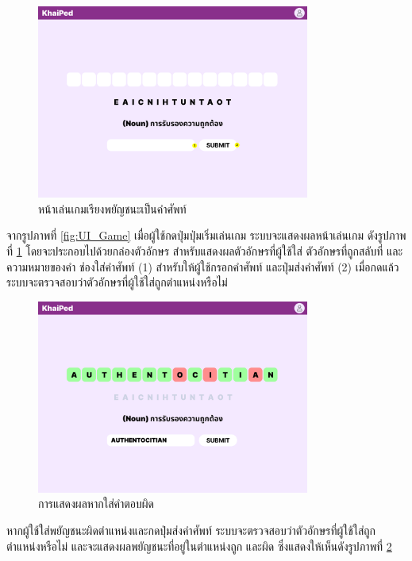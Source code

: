 \documentclass[12pt,oneside,openright,a4paper]{cpe-thai-project}
\begin{document}
\pagebreak
\begin{figure}[!h]\centering
	\includegraphics[width=0.8\textwidth, keepaspectratio=true]{image/chap3/ui/game/Word Scramble - Start.png}
	\caption{หน้าเล่นเกมเรียงพยัญชนะเป็นคำศัพท์}\label{fig:UI_StartGame}
\end{figure}
\hspace{1cm}
จากรูปภาพที่ \ref{fig:UI_Game} เมื่อผู้ใช้กดปุ่มปุ่มเริ่มเล่นเกม ระบบจะแสดงผลหน้าเล่นเกม ดังรูปภาพที่ \ref{fig:UI_StartGame}
โดยจะประกอบไปด้วยกล่องตัวอักษร สำหรับแสดงผลตัวอักษรที่ผู้ใช้ใส่ ตัวอักษรที่ถูกสลับที่
และความหมายของคำ ช่องใส่คำศัพท์ (1) สำหรับให้ผู้ใช้กรอกคำศัพท์ และปุ่มส่งคำศัพท์ (2) เมื่อกดแล้วระบบจะตรวจสอบว่าตัวอักษรที่ผู้ใช้ใส่ถูกตำแหน่งหรือไม่

\begin{figure}[!h]\centering
	\includegraphics[width=0.8\textwidth, keepaspectratio=true]{image/chap3/ui/game/Word Scramble - Wrong Answer.png}
	\caption{การแสดงผลหากใส่คำตอบผิด}\label{fig:UI_GameWrong}
\end{figure}
\hspace{1cm}
หากผู้ใช้ใส่พยัญชนะผิดตำแหน่งและกดปุ่มส่งคำศัพท์ ระบบจะตรวจสอบว่าตัวอักษรที่ผู้ใช้ใส่ถูกตำแหน่งหรือไม่ และจะแสดงผลพยัญชนะที่อยู่ในตำแหน่งถูก และผิด
ซึ่งแสดงให้เห็นดังรูปภาพที่ \ref{fig:UI_GameWrong}
\end{document}
